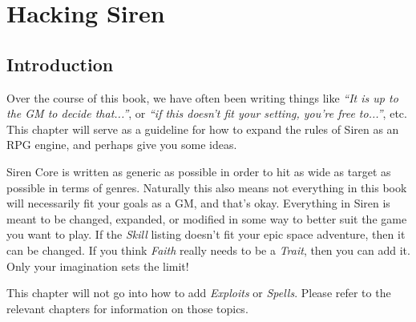 \chapter{Hacking Siren}
\section{Introduction}
Over the course of this book, we have often been writing things like \textit{``It is up to the GM to decide that...''}, or \textit{``if this doesn't fit your setting, you're free to...''}, etc.
This chapter will serve as a guideline for how to expand the rules of Siren as an RPG engine, and perhaps give you some ideas.

Siren Core is written as generic as possible in order to hit as wide as target as possible in terms of genres.
Naturally this also means not everything in this book will necessarily fit your goals as a GM, and that's okay.
Everything in Siren is meant to be changed, expanded, or modified in some way to better suit the game you want to play.
If the \textit{Skill} listing doesn't fit your epic space adventure, then it can be changed.
If you think \textit{Faith} really needs to be a \textit{Trait}, then you can add it.
Only your imagination sets the limit!

\begin{note}
    This chapter will not go into how to add \textit{Exploits} or \textit{Spells}.
    Please refer to the relevant chapters for information on those topics.
\end{note}




